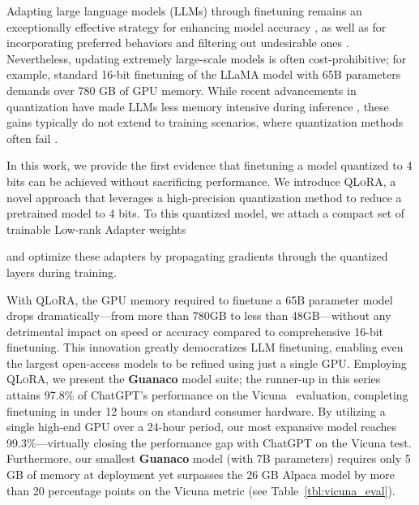 Adapting large language models (LLMs) through finetuning remains an exceptionally effective strategy for enhancing model accuracy \citep{min2021metaicl, wei2021finetuned, ouyang2022training, wang2022super, wang2022self, liu2022few}, as well as for incorporating preferred behaviors and filtering out undesirable ones \citep{ouyang2022training,askell2021general,bai2022training}. Nevertheless, updating extremely large-scale models is often cost-prohibitive; for example, standard 16-bit finetuning of the LLaMA model with 65B parameters~\citep{touvron2023llama} demands over 780 GB of GPU memory. While recent advancements in quantization have made LLMs less memory intensive during inference \citep{dettmers2022llm, dettmers2022case, frantar2022gptq, xiao2022smoothquant}, these gains typically do not extend to training scenarios, where quantization methods often fail \citep{wortsman2023stable}.

In this work, we provide the first evidence that finetuning a model quantized to 4 bits can be achieved without sacrificing performance. We introduce \textsc{QLoRA}, a novel approach that leverages a high-precision quantization method to reduce a pretrained model to 4 bits. To this quantized model, we attach a compact set of trainable Low-rank Adapter weights \citep{hu2021lora}

and optimize these adapters by propagating gradients through the quantized layers during training.

With \textsc{QLoRA}, the GPU memory required to finetune a 65B parameter model drops dramatically—from more than 780GB to less than 48GB—without any detrimental impact on speed or accuracy compared to comprehensive 16-bit finetuning. This innovation greatly democratizes LLM finetuning, enabling even the largest open-access models to be refined using just a single GPU. Employing \textsc{QLoRA}, we present the \textbf{Guanaco} model suite; the runner-up in this series attains 97.8\% of ChatGPT's performance on the Vicuna~\citep{vicuna2023} evaluation, completing finetuning in under 12 hours on standard consumer hardware. By utilizing a single high-end GPU over a 24-hour period, our most expansive model reaches 99.3\%—virtually closing the performance gap with ChatGPT on the Vicuna test. Furthermore, our smallest \textbf{Guanaco} model (with 7B parameters) requires only 5 GB of memory at deployment yet surpasses the 26 GB Alpaca model by more than 20 percentage points on the Vicuna metric (see Table~\ref{tbl:vicuna_eval}).

